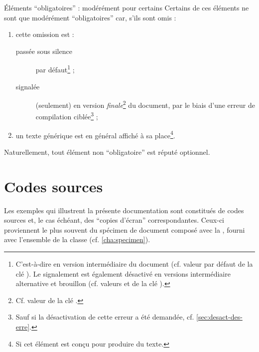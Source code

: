 \begin{dbremark}{Éléments \enquote{obligatoires} : modérément pour certains}{}
  Certains de ces éléments ne sont que modérément \enquote{obligatoires} car,
  s'ils sont omis :
  \begin{enumerate}
  \item cette omission est :
    \begin{description}
    \item[passée sous silence] par défaut\footnote{C'est-à-dire en version
        intermédiaire du document (cf. valeur par défaut 
        de la clé ). Le signalement est également désactivé en
        versions intermédiaire alternative et brouillon (cf. valeurs
         et  de la clé
        ).} ;
    \item[signalée] (seulement) en version \emph{finale}\footnote{Cf. valeur
         de la clé .} du document, par le biais
      d'une erreur de compilation ciblée\footnote{Sauf si la désactivation de
        cette erreur a été demandée, cf. \vref{sec:desact-des-erre}.} ;
    \end{description}
  \item un texte générique est en général affiché à sa place\footnote{Si cet
      élément est conçu pour produire du texte.}.
  \end{enumerate}
\end{dbremark}

Naturellement, tout élément non \enquote{obligatoire} est réputé optionnel.

\section{Codes sources}
\label{sec:codes-sources}

Les exemples qui illustrent la présente documentation sont constitués de codes
sources et, le cas échéant, des \enquote{copies d'écran} correspondantes.
Ceux-ci proviennent le plus souvent du spécimen de document composé avec la
\yatcl, fourni avec l'ensemble de la classe (cf. \vref{cha:specimen}).

